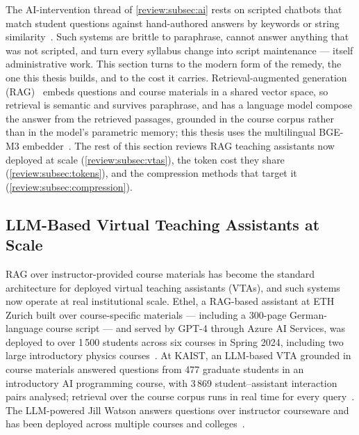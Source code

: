 The AI-intervention thread of \autoref{review:subsec:ai} rests on scripted
chatbots that match student questions against hand-authored answers by
keywords or string similarity~\cite{icacci17:Ranoliya, sust22:Ahmad}.
Such systems are brittle to paraphrase, cannot answer anything that was not
scripted, and turn every syllabus change into script maintenance --- itself
administrative work. This section turns to the modern form of the remedy,
the one this thesis builds, and to the cost it carries. Retrieval-augmented
generation (RAG)~\cite{neurips20:Lewis} embeds questions and course materials
in a shared vector space, so retrieval is semantic and survives paraphrase,
and has a language model compose the answer from the retrieved passages,
grounded in the course corpus rather than in the model's parametric memory;
this thesis uses the multilingual BGE-M3 embedder~\cite{arxiv24:Chen}.
The rest of this section reviews RAG teaching assistants now deployed at
scale (\autoref{review:subsec:vtas}), the token cost they share
(\autoref{review:subsec:tokens}), and the compression methods that target it
(\autoref{review:subsec:compression}).

\subsection{LLM-Based Virtual Teaching Assistants at Scale}
\label{review:subsec:vtas}

RAG over instructor-provided course materials has become the standard
architecture for deployed virtual teaching assistants (VTAs), and such
systems now operate at real institutional scale. Ethel, a RAG-based assistant
at ETH Zurich built over course-specific materials --- including a 300-page
German-language course script --- and served by GPT-4 through Azure AI
Services, was deployed to over 1\,500 students across six courses in Spring
2024, including two large introductory physics
courses~\cite{tpt24:Kortemeyer}. At KAIST, an LLM-based VTA grounded in
course materials answered questions from 477 graduate students in an
introductory AI programming course, with 3\,869 student--assistant interaction
pairs analysed; retrieval over the course corpus runs in real time for every
query~\cite{acl25:Kweon}. The LLM-powered Jill Watson answers questions over
instructor courseware and has been deployed across multiple courses and
colleges~\cite{arxiv24:JillWatson}.

